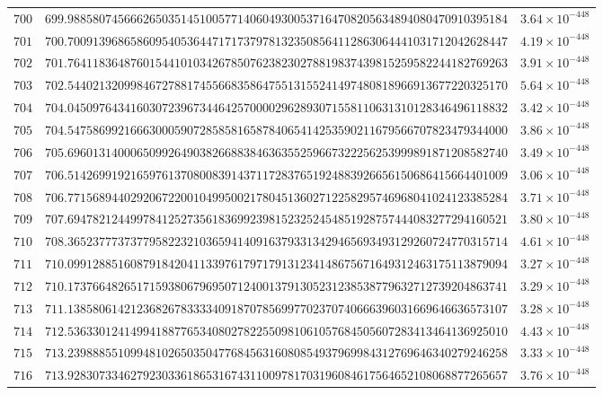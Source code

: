 \documentclass[12pt,reqno]{amsart}
\theoremstyle{remark}
\begin{document}
\begin{longtable}{clc}
$700$ & $699.9885807456662650351451005771406049300537164708205634894080470910395184$ & $3.64\times 10^{-448}$ \\
$701$ & $700.7009139686586095405364471717379781323508564112863064441031712042628447$ & $4.19\times 10^{-448}$ \\
$702$ & $701.7641183648760154410103426785076238230278819837439815259582244182769263$ & $3.91\times 10^{-448}$ \\
$703$ & $702.5440213209984672788174556683586475513155241497480818966913677220325170$ & $5.64\times 10^{-448}$ \\
$704$ & $704.0450976434160307239673446425700002962893071558110631310128346496118832$ & $3.42\times 10^{-448}$ \\
$705$ & $704.5475869921666300059072858581658784065414253590211679566707823479344000$ & $3.86\times 10^{-448}$ \\
$706$ & $705.6960131400065099264903826688384636355259667322256253999891871208582740$ & $3.49\times 10^{-448}$ \\
$707$ & $706.5142699192165976137080083914371172837651924883926656150686415664401009$ & $3.06\times 10^{-448}$ \\
$708$ & $706.7715689440292067220010499500217804513602712258295746968041024123385284$ & $3.71\times 10^{-448}$ \\
$709$ & $707.6947821244997841252735618369923981523252454851928757444083277294160521$ & $3.80\times 10^{-448}$ \\
$710$ & $708.3652377737377958223210365941409163793313429465693493129260724770315714$ & $4.61\times 10^{-448}$ \\
$711$ & $710.0991288516087918420411339761797179131234148675671649312463175113879094$ & $3.27\times 10^{-448}$ \\
$712$ & $710.1737664826517159380679695071240013791305231238538779632712739204863741$ & $3.29\times 10^{-448}$ \\
$713$ & $711.1385806142123682678333340918707856997702370740666396031669646636573107$ & $3.28\times 10^{-448}$ \\
$714$ & $712.5363301241499418877653408027822550981061057684505607283413464136925010$ & $4.43\times 10^{-448}$ \\
$715$ & $713.2398885510994810265035047768456316080854937969984312769646340279246258$ & $3.33\times 10^{-448}$ \\
$716$ & $713.9283073346279230336186531674311009781703196084617564652108068877265657$ & $3.76\times 10^{-448}$ \\

\end{longtable}
\end{document}

